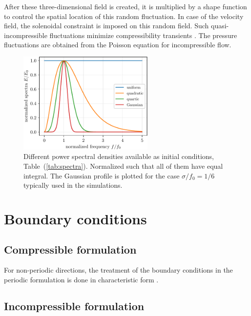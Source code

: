 After these three-dimensional field is created, it is multiplied by a shape function to control the spatial location of this random fluctuation. In case of the velocity field, the solenoidal constraint is imposed on this random field. Such quasi-incompressible fluctuations minimize compressibility transients \cite{Erlebacher:1990}. The pressure fluctuations are obtained from the Poisson equation for incompressible flow.

\begin{figure}
  \includegraphics[clip,width=0.6\textwidth]{figs/spectra}
  \caption{Different power spectral densities available as initial conditions, Table~(\ref{tab:spectra}). Normalized such that all of them have equal integral. The Gaussian profile is plotted for the case $\sigma/f_0=1/6$ typically used in the simulations.}
  \label{fig:spectra}
\end{figure}

\section{Boundary conditions}

\subsection{Compressible formulation}

For non-periodic directions, the treatment of the boundary conditions in the
periodic formulation is done in characteristic form
\citep{Thompson:1987,Thompson:1990,Lodato:2008}.

\subsection{Incompressible formulation}

